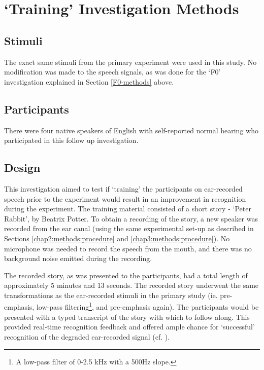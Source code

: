 \section{`Training' Investigation Methods}
\label{training-methods}

\subsection{Stimuli}

The exact same stimuli from the primary experiment were used in this study. No modification was made to the speech signals, as was done for the `F0' investigation explained in Section \ref{F0-methods} above.

\subsection{Participants}

There were four native speakers of English with self-reported normal hearing who participated in this follow up investigation.

\subsection{Design}

This investigation aimed to test if `training' the participants on ear-recorded speech prior to the experiment would result in an improvement in recognition during the experiment.  The training material consisted of a short story - `Peter Rabbit', by Beatrix Potter.  To obtain a recording of the story, a new speaker was recorded from the ear canal (using the same experimental set-up as described in Sections \ref{chap2:methods:procedure} and \ref{chap3:methods:procedure}).  No microphone was needed to record the speech from the mouth, and there was no background noise emitted during the recording.  

The recorded story, as was presented to the participants, had a total length of approximately 5 minutes and 13 seconds.  The recorded story underwent the same transformations as the ear-recorded stimuli in the primary study (ie. pre-emphasis, low-pass filtering\footnote{A low-pass filter of 0-2.5 kHz with a 500Hz slope.}, and pre-emphasis again).  The participants would be presented with a typed transcript of the story with which to follow along.  This provided real-time recognition feedback and offered ample chance for `successful' recognition of the degraded ear-recorded signal (cf. \cite{davis:05}).


